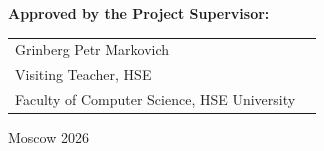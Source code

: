 \begin{titlepage}
\vspace{1em}
{\bf Approved by the Project Supervisor: \vspace{2mm}}

{
\begin{tabular}{l@{\hskip 1.5cm}l}
Grinberg Petr Markovich\\
Visiting Teacher, HSE\\
Faculty of Computer Science, HSE University 
\end{tabular}}





\vspace{\fill}

\begin{center}
Moscow 2026
\end{center}

\end{titlepage}